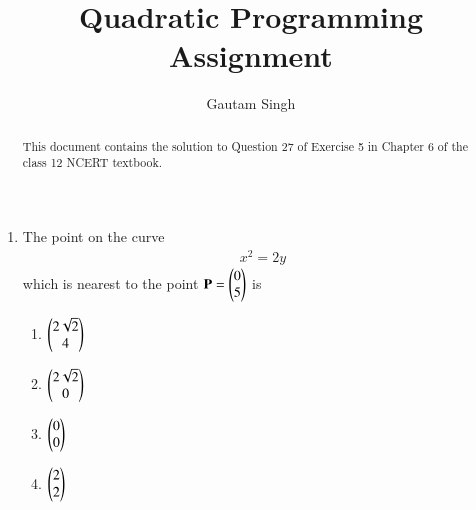 \documentclass[journal,12pt,twocolumn]{IEEEtran}
\renewcommand{\vec}[1]{\boldsymbol{\mathbf{#1}}}
\begin{document}
\vspace{3cm}
\title{Quadratic Programming Assignment}
\author{Gautam Singh}
\maketitle
\bigskip

\begin{abstract}
    This document contains the solution to Question 27 of Exercise 5 in Chapter
    6 of the class 12 NCERT textbook.
\end{abstract}

\begin{enumerate}
    \item The point on the curve 
    \begin{align}
        x^2 = 2y
        \label{eq:curve}
    \end{align}
    which is nearest to the point 
    $\vec{P} = \myvec{0\\5}$ is
    \begin{enumerate}
        \item $\begin{pmatrix}2\sqrt{2}\\4\end{pmatrix}$
        \item $\begin{pmatrix}2\sqrt{2}\\0\end{pmatrix}$
        \item $\begin{pmatrix}0\\0\end{pmatrix}$
        \item $\begin{pmatrix}2\\2\end{pmatrix}$
    \end{enumerate}


\end{enumerate}
\end{document}
